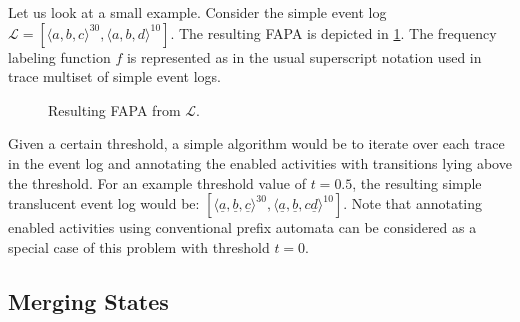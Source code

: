 Let us look at a small example. Consider the simple event log $\mathcal{L} = [\langle a, b, c \rangle^{30}, \langle a, b, d \rangle^{10}]$. The resulting FAPA is depicted in \ref{fig:fapa}. The frequency labeling function $f$ is represented as in the usual superscript notation used in trace multiset of simple event logs.


\begin{figure}[H]
    \centering
    \caption{Resulting FAPA from $\mathcal{L}$.}
    \label{fig:fapa}
\end{figure}

Given a certain threshold, a simple algorithm would be to iterate over each trace in the event log and annotating the enabled activities with transitions lying above the threshold. For an example threshold value of $t = 0.5$, the resulting simple translucent event log would be: $[\langle \underline{a}, \underline{b}, \underline{c} \rangle^{30}, \langle \underline{a}, \underline{b}, c\underline{d}\rangle^{10}]$. Note that annotating enabled activities using conventional prefix automata can be considered as a special case of this problem with threshold $t = 0$.

\subsection{Merging States}

